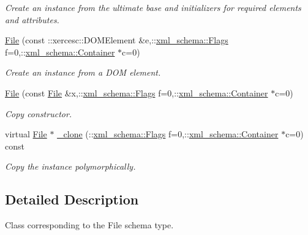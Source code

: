 \begin{DoxyCompactItemize}
\begin{DoxyCompactList}\small\item\em Create an instance from the ultimate base and initializers for required elements and attributes. \item\end{DoxyCompactList}\item 
\hyperlink{classopenstack_1_1xml_1_1File_aa617037079b515330c7f51bbe1efee87}{File} (const ::xercesc::DOMElement \&e,::\hyperlink{namespacexml__schema_affb4c227cbd9aa7453dd1dc5a1401943}{xml\_\-schema::Flags} f=0,::\hyperlink{namespacexml__schema_a333dea2213742aea47a37532dec4ec27}{xml\_\-schema::Container} $\ast$c=0)
\begin{DoxyCompactList}\small\item\em Create an instance from a DOM element. \item\end{DoxyCompactList}\item 
\hyperlink{classopenstack_1_1xml_1_1File_a066ee786b1c2c7279b2e2456b19380b1}{File} (const \hyperlink{classopenstack_1_1xml_1_1File}{File} \&x,::\hyperlink{namespacexml__schema_affb4c227cbd9aa7453dd1dc5a1401943}{xml\_\-schema::Flags} f=0,::\hyperlink{namespacexml__schema_a333dea2213742aea47a37532dec4ec27}{xml\_\-schema::Container} $\ast$c=0)
\begin{DoxyCompactList}\small\item\em Copy constructor. \item\end{DoxyCompactList}\item 
virtual \hyperlink{classopenstack_1_1xml_1_1File}{File} $\ast$ \hyperlink{classopenstack_1_1xml_1_1File_a80dde80c384d31aee17bd496722dc7f7}{\_\-clone} (::\hyperlink{namespacexml__schema_affb4c227cbd9aa7453dd1dc5a1401943}{xml\_\-schema::Flags} f=0,::\hyperlink{namespacexml__schema_a333dea2213742aea47a37532dec4ec27}{xml\_\-schema::Container} $\ast$c=0) const 
\begin{DoxyCompactList}\small\item\em Copy the instance polymorphically. \item\end{DoxyCompactList}\end{DoxyCompactItemize}


\subsection{Detailed Description}
Class corresponding to the File schema type. 

